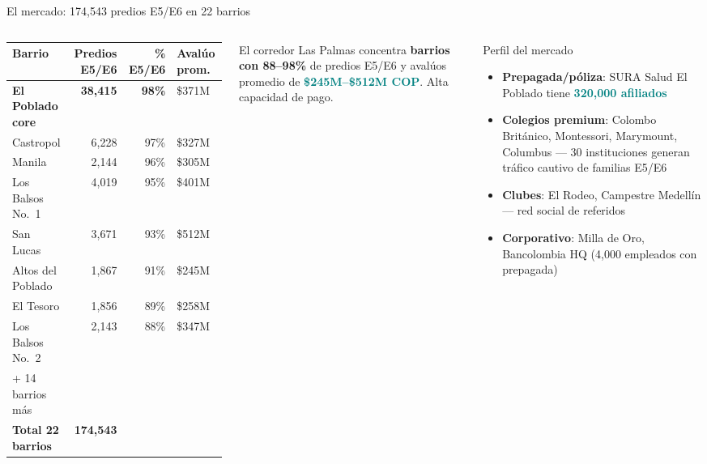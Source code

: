 \documentclass[aspectratio=169, 11pt]{beamer}
\newcommand{\highlight}[1]{\textcolor{teal}{\textbf{#1}}}
\newcommand{\src}[1]{\par\vspace{2pt}{\tiny\textcolor{slate}{Fuente: #1}}}
\begin{document}
\begin{frame}{El mercado: 174,543 predios E5/E6 en 22 barrios}

\begin{columns}[T]
{\scriptsize
\begin{tabular}{@{}lrrl@{}}
\toprule
\textbf{Barrio} & \textbf{Predios E5/E6} & \textbf{\% E5/E6} & \textbf{Avalúo prom.} \\
\midrule
\rowcolor{teal!8}
\textbf{El Poblado core} & \textbf{38,415} & \textbf{98\%} & \$371M \\
Castropol & 6,228 & 97\% & \$327M \\
Manila & 2,144 & 96\% & \$305M \\
Los Balsos No.\ 1 & 4,019 & 95\% & \$401M \\
San Lucas & 3,671 & 93\% & \$512M \\
\rowcolor{teal!6}
Altos del Poblado & 1,867 & 91\% & \$245M \\
El Tesoro & 1,856 & 89\% & \$258M \\
Los Balsos No.\ 2 & 2,143 & 88\% & \$347M \\
{\tiny + 14 barrios más} & & & \\
\midrule
\textbf{Total 22 barrios} & \textbf{174,543} & & \\
\bottomrule
\end{tabular}
}

\vspace{4pt}
\src{Catastro Municipal Medellín (bp59-rj8r), 1,041,413 predios}

\vspace{6pt}
{\footnotesize El corredor Las Palmas concentra \textbf{barrios con 88--98\%} de predios E5/E6 y avalúos promedio de \highlight{\$245M--\$512M COP}. Alta capacidad de pago.}

\begin{exampleblock}{\small Perfil del mercado}
\footnotesize
\begin{itemize}
  \item \textbf{Prepagada/póliza}: SURA Salud El Poblado tiene \highlight{320,000 afiliados}
  \item \textbf{Colegios premium}: Colombo Británico, Montessori, Marymount, Columbus --- 30 instituciones generan tráfico cautivo de familias E5/E6
  \item \textbf{Clubes}: El Rodeo, Campestre Medellín --- red social de referidos
  \item \textbf{Corporativo}: Milla de Oro, Bancolombia HQ (4,000 empleados con prepagada)
\end{itemize}
\end{exampleblock}


\end{columns}
\end{frame}
\end{document}
